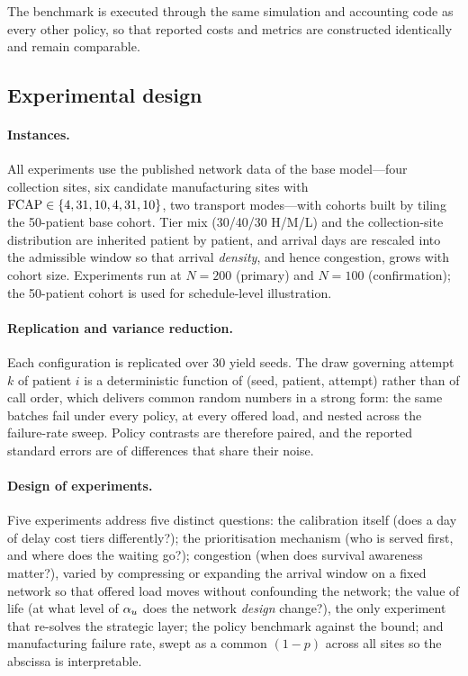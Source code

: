 The benchmark is executed through the same simulation and accounting code as
every other policy, so that reported costs and metrics are constructed
identically and remain comparable.

\subsection{Experimental design}
\label{sec:design}

\paragraph{Instances.} All experiments use the published network data of the base model---four
collection sites, six candidate manufacturing sites with $\mathrm{FCAP} \in \{4, 31,
10, 4, 31, 10\}$, two transport modes---with cohorts built by tiling the
50-patient base cohort. Tier mix (30/40/30 H/M/L) and the collection-site
distribution are inherited patient by patient, and arrival days are rescaled
into the admissible window so that arrival \emph{density}, and hence
congestion, grows with cohort size. Experiments run at $N = 200$ (primary) and
$N = 100$ (confirmation); the 50-patient cohort is used for schedule-level
illustration.

\paragraph{Replication and variance reduction.} Each configuration is
replicated over 30 yield seeds. The draw governing attempt $k$ of patient $i$
is a deterministic function of (seed, patient, attempt) rather than of call
order, which delivers common random numbers in a strong form: the same batches
fail under every policy, at every offered load, and nested across the
failure-rate sweep. Policy contrasts are therefore paired, and the reported
standard errors are of differences that share their noise.

\paragraph{Design of experiments.} Five experiments address five distinct
questions: the calibration itself (does a day of delay cost tiers
differently?); the prioritisation mechanism (who is served first, and where
does the waiting go?); congestion (when does survival awareness matter?),
varied by compressing or expanding the arrival window on a fixed network so
that offered load moves without confounding the network; the value of life (at
what level of $\alpha_{u}$ does the network \emph{design} change?), the only
experiment that
re-solves the strategic layer; the policy benchmark against the bound; and
manufacturing failure rate, swept as a common $(1 - p)$ across all sites so the
abscissa is interpretable.

